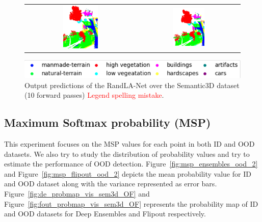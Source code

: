 \begin{figure}[h!]
\begin{tabular}{cc}
            \includegraphics[width=0.33\textwidth, height=0.18\textheight]{images/ood_imgs/fout_sem3d/fout_3.pdf}&
            \includegraphics[width=0.33\textwidth, height=0.18\textheight]{images/sem3d_of/fout_sem3d_of_3.pdf}\\
        \end{tabular}
        \includegraphics[scale=0.65]{images/legend.png}
        \caption{Output predictions of the RandLA-Net over the Semantic3D dataset (10 forward passes) \textcolor{red}{Legend spelling mistake}.}
        \label{fig:flipout_vis_sem3d_OF}
    \end{figure}   
    \FloatBarrier


    \subsection{Maximum Softmax probability (MSP)}
    This experiment focuses on the MSP values for each point in both ID and OOD datasets.
    We also try to study the distribution of probability values and try to estimate the performance of OOD detection.
    Figure~\ref{fig:msp_ensembles_ood_2} and Figure~\ref{fig:msp_flipout_ood_2} depicts the mean probability value for ID and OOD dataset along with the variance represented as error bars.
    Figure~\ref{fig:de_probmap_vis_sem3d_OF} and Figure~\ref{fig:fout_probmap_vis_sem3d_OF} represents the probability map of ID and OOD datasets for Deep Ensembles and Flipout respectively.

